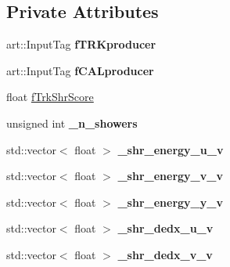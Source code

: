 \subsection*{Private Attributes}
\begin{DoxyCompactItemize}
\item 
\hypertarget{classanalysis_1_1ShowerAnalysis_aaf85b896fee0cd1a3f089e14c48d6849}{art\-::\-Input\-Tag {\bfseries f\-T\-R\-Kproducer}}\label{classanalysis_1_1ShowerAnalysis_aaf85b896fee0cd1a3f089e14c48d6849}

\item 
\hypertarget{classanalysis_1_1ShowerAnalysis_afc78776f278428b5919f03dc97d71789}{art\-::\-Input\-Tag {\bfseries f\-C\-A\-Lproducer}}\label{classanalysis_1_1ShowerAnalysis_afc78776f278428b5919f03dc97d71789}

\item 
float \hyperlink{classanalysis_1_1ShowerAnalysis_a6c8d14b6e2fa51eeda76204dbd27ca3d}{f\-Trk\-Shr\-Score}
\item 
\hypertarget{classanalysis_1_1ShowerAnalysis_a421f0c13019ec5da2784f611b43cfe2d}{unsigned int {\bfseries \-\_\-n\-\_\-showers}}\label{classanalysis_1_1ShowerAnalysis_a421f0c13019ec5da2784f611b43cfe2d}

\item 
\hypertarget{classanalysis_1_1ShowerAnalysis_a0aae9ad74279a378774ca23acf1e0d39}{std\-::vector$<$ float $>$ {\bfseries \-\_\-shr\-\_\-energy\-\_\-u\-\_\-v}}\label{classanalysis_1_1ShowerAnalysis_a0aae9ad74279a378774ca23acf1e0d39}

\item 
\hypertarget{classanalysis_1_1ShowerAnalysis_a1b6590c13db0591057e62aa7dc3b5325}{std\-::vector$<$ float $>$ {\bfseries \-\_\-shr\-\_\-energy\-\_\-v\-\_\-v}}\label{classanalysis_1_1ShowerAnalysis_a1b6590c13db0591057e62aa7dc3b5325}

\item 
\hypertarget{classanalysis_1_1ShowerAnalysis_a9052a49fa94e24eaaa54835367cdfb90}{std\-::vector$<$ float $>$ {\bfseries \-\_\-shr\-\_\-energy\-\_\-y\-\_\-v}}\label{classanalysis_1_1ShowerAnalysis_a9052a49fa94e24eaaa54835367cdfb90}

\item 
\hypertarget{classanalysis_1_1ShowerAnalysis_ad3878ea733bc29d9ab82b582e0e90718}{std\-::vector$<$ float $>$ {\bfseries \-\_\-shr\-\_\-dedx\-\_\-u\-\_\-v}}\label{classanalysis_1_1ShowerAnalysis_ad3878ea733bc29d9ab82b582e0e90718}

\item 
\hypertarget{classanalysis_1_1ShowerAnalysis_a7dcd77f736a484a5ef26ee78636773f6}{std\-::vector$<$ float $>$ {\bfseries \-\_\-shr\-\_\-dedx\-\_\-v\-\_\-v}}\label{classanalysis_1_1ShowerAnalysis_a7dcd77f736a484a5ef26ee78636773f6}


\end{DoxyCompactItemize}
